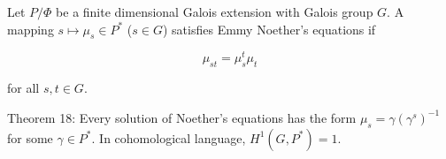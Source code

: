 Let $P/\Phi$ be a finite dimensional Galois extension with Galois group $G$. A mapping $s \mapsto \mu_s \in P^*$ ($s \in G$) satisfies Emmy Noether's equations if

$$\mu_{st} = \mu_s^t \mu_t$$

for all $s, t \in G$. 

Theorem 18: Every solution of Noether's equations has the form $\mu_s = \gamma(\gamma^s)^{-1}$ for some $\gamma \in P^*$. In cohomological language, $H^1(G, P^*) = 1$.
